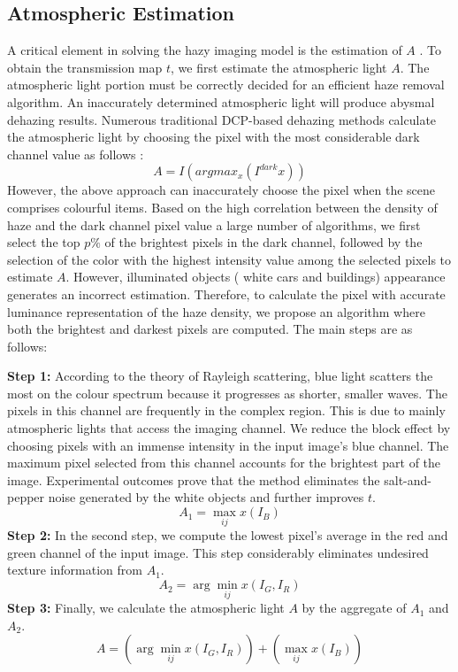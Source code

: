 \documentclass[doctor,english,listoffigures,listoftables]{thesis-uestc}
\begin{document}
\subsection{Atmospheric Estimation}
 A critical element in solving the hazy imaging model is the estimation of $A$ . To obtain the transmission map $t$, we first estimate the atmospheric light $A$. The atmospheric light portion must be correctly decided for an efficient haze removal algorithm. An inaccurately determined atmospheric light will produce abysmal dehazing results.
 Numerous traditional DCP-based dehazing methods calculate the atmospheric light by choosing the pixel with the most considerable dark channel value as follows :
\begin{equation}
A=I(argmax_x(I^{dark} x))
\end{equation} 
However, the above approach can inaccurately choose the pixel when the scene comprises colourful items. Based on the high correlation between the density of haze and the dark channel pixel value a large number of algorithms, we first select the top $p\%$ of the brightest pixels in the dark channel, followed by the selection of the color with the highest intensity value among the selected pixels to estimate $A$. However, illuminated objects ( white cars and buildings) appearance generates an incorrect estimation. 
Therefore, to calculate the pixel with accurate luminance representation of the haze density, we propose an algorithm where both the brightest and darkest pixels are computed. The main steps are as follows:\par
\textbf{Step 1:} According to the theory of Rayleigh scattering, blue light scatters the most on the colour spectrum because it progresses as shorter, smaller waves. The pixels in this channel are frequently in the complex region.  This is due to mainly atmospheric lights that access the imaging channel. We reduce the block effect by choosing pixels with an immense intensity in the input image's blue channel. The maximum pixel selected from this channel accounts for the brightest part of the image. Experimental outcomes prove that the method eliminates the salt-and-pepper noise generated by the white objects and further improves $t$.
\begin{equation}
A_1= \max_{ij}x(I_B)
\end{equation} 
\textbf{Step 2:} In the second step, we compute the lowest pixel's average in the red and green channel of the input image. This step considerably eliminates undesired texture information from $A_1$. 
\begin{equation}
A_2= \arg\min_{ij}x(I_G,I_R)
\end{equation} 
\textbf{Step 3:} Finally, we calculate the atmospheric light $A$ by the aggregate of $A_1$ and $A_2$. 
\begin{equation}
A= (\arg\min_{ij}x(I_G,I_R))+(\max_{ij}x(I_B))
\end{equation} 
\end{document}
